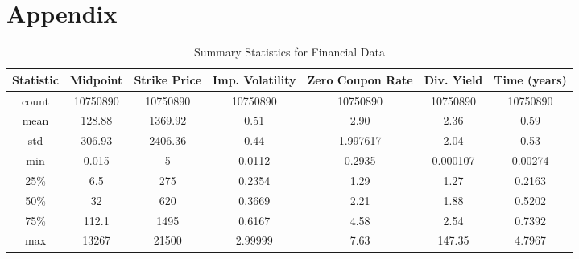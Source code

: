 \documentclass[a4paper]{article}
\begin{document}
\onecolumn %

\appendix
\section{\label{sec:appendix}Appendix}

\begin{table}[htbp]
\centering
\caption{Summary Statistics for Financial Data}
\label{table:financialdata}
\begin{tabular}{ccccccc}
\hline
Statistic & Midpoint & Strike Price & Imp. Volatility & Zero Coupon Rate & Div. Yield & Time (years)\\
\hline
count & \num{10750890} & \num{10750890} & \num{10750890} & \num{10750890} & \num{10750890} & \num{10750890}\\
mean & \num{128.88} & \num{1369.92} & \num{0.51} & \num{2.90} & \num{2.36} & \num{0.59}\\
std & \num{306.93} & \num{2406.36} & \num{0.44} & \num{1.997617} & \num{2.04} & \num{0.53}\\
min & \num{0.015} & \num{5} & \num{0.0112} & \num{0.2935} & \num{0.000107} & \num{0.00274}\\
25\% & \num{6.5} & \num{275} & \num{0.2354} & \num{1.29} & \num{1.27} & \num{0.2163}\\
50\% & \num{32} & \num{620} & \num{0.3669} & \num{2.21} & \num{1.88} & \num{0.5202}\\
75\% & \num{112.1} & \num{1495} & \num{0.6167} & \num{4.58} & \num{2.54} & \num{0.7392}\\
max & \num{13267} & \num{21500} & \num{2.99999} & \num{7.63} & \num{147.35} & \num{4.7967}\\
\hline
\end{tabular}
\end{table}
\end{document}
